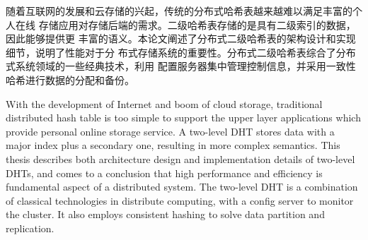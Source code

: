 
\begin{cabstract}
随着互联网的发展和云存储的兴起，传统的分布式哈希表越来越难以满足丰富的个人在线
存储应用对存储后端的需求。二级哈希表存储的是具有二级索引的数据，因此能够提供更
丰富的语义。本论文阐述了分布式二级哈希表的架构设计和实现细节，说明了性能对于分
布式存储系统的重要性。分布式二级哈希表综合了分布式系统领域的一些经典技术，利用
配置服务器集中管理控制信息，并采用一致性哈希进行数据的分配和备份。
\end{cabstract}


\begin{eabstract} 
With the development of Internet and boom of cloud storage, traditional
distributed hash table is too simple to support the upper layer applications
which provide personal online storage service. A two-level DHT stores data
with a major index plus a secondary one, resulting in more complex semantics.
This thesis describes both architecture design and implementation details of
two-level DHTs, and comes to a conclusion that high performance and efficiency
is fundamental aspect of a distributed system. The two-level DHT is a
combination of classical technologies in distribute computing, with a config
server to monitor the cluster. It also employs consistent hashing to solve
data partition and replication.
\end{eabstract}

